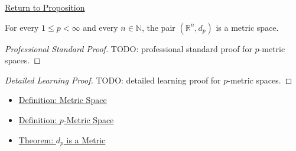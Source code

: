 \newpage
{}
\label{prf:lp-metric-space-instance}

\begin{remark*}[Return]
\hyperref[prop:lp-metric-space-instance]{Return to Proposition}
\end{remark*}

\begin{proposition*}
For every \(1\leq p<\infty\) and every \(n\in\mathbb{N}\), the pair
\((\mathbb{R}^n,d_p)\) is a metric space.
\end{proposition*}

\begin{proof}[Professional Standard Proof]
\LRAProofBodyStart
TODO: professional standard proof for \(p\)-metric spaces.
\end{proof}

\begin{proof}[Detailed Learning Proof]
\LRAProofBodyStart
TODO: detailed learning proof for \(p\)-metric spaces.
\end{proof}

\begin{remark*}
\end{remark*}

\begin{dependencies}
\begin{itemize}
  \item \hyperref[def:metric-space]{Definition: Metric Space}
  \item \hyperref[def:lp-metric-space]{Definition: \(p\)-Metric Space}
  \item \hyperref[thm:lp-metric-rn]{Theorem: \(d_p\) is a Metric}
\end{itemize}
\end{dependencies}

\clearpage
